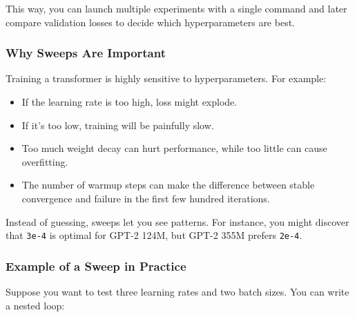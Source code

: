 \documentclass[
  letterpaper,
  DIV=11,
  numbers=noendperiod]{scrreprt}
\newenvironment{Shaded}{\begin{snugshade}}{\end{snugshade}}
\newcommand{\AttributeTok}[1]{\textcolor[rgb]{0.40,0.45,0.13}{#1}}
\newcommand{\BuiltInTok}[1]{\textcolor[rgb]{0.00,0.23,0.31}{#1}}
\newcommand{\ControlFlowTok}[1]{\textcolor[rgb]{0.00,0.23,0.31}{\textbf{#1}}}
\newcommand{\ExtensionTok}[1]{\textcolor[rgb]{0.00,0.23,0.31}{#1}}
\newcommand{\KeywordTok}[1]{\textcolor[rgb]{0.00,0.23,0.31}{\textbf{#1}}}
\newcommand{\NormalTok}[1]{\textcolor[rgb]{0.00,0.23,0.31}{#1}}
\newcommand{\OperatorTok}[1]{\textcolor[rgb]{0.37,0.37,0.37}{#1}}
\newcommand{\StringTok}[1]{\textcolor[rgb]{0.13,0.47,0.30}{#1}}
\newcommand{\VariableTok}[1]{\textcolor[rgb]{0.07,0.07,0.07}{#1}}
\providecommand{\tightlist}{%
  \setlength{\itemsep}{0pt}\setlength{\parskip}{0pt}}
\begin{document}
This way, you can launch multiple experiments with a single command and
later compare validation losses to decide which hyperparameters are
best.

\subsubsection{Why Sweeps Are Important}\label{why-sweeps-are-important}

Training a transformer is highly sensitive to hyperparameters. For
example:

\begin{itemize}
\tightlist
\item
  If the learning rate is too high, loss might explode.
\item
  If it's too low, training will be painfully slow.
\item
  Too much weight decay can hurt performance, while too little can cause
  overfitting.
\item
  The number of warmup steps can make the difference between stable
  convergence and failure in the first few hundred iterations.
\end{itemize}

Instead of guessing, sweeps let you see patterns. For instance, you
might discover that \texttt{3e-4} is optimal for GPT-2 124M, but GPT-2
355M prefers \texttt{2e-4}.

\subsubsection{Example of a Sweep in
Practice}\label{example-of-a-sweep-in-practice}

Suppose you want to test three learning rates and two batch sizes. You
can write a nested loop:

\begin{Shaded}
\end{Shaded}
\end{document}
